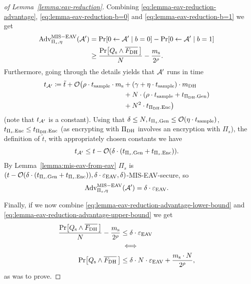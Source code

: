 \begin{proof}[of Lemma~\ref{lemma:eav-reduction}]
	Combining \eqref{eq:lemma-eav-reduction-advantage}, \eqref{eq:lemma-eav-reduction-b=0} and \eqref{eq:lemma-eav-reduction-b=1} we get
	\begin{align} \label{eq:lemma-eav-reduction-advantage-lower-bound}
		\begin{split}
			\advantage{\Pi_s}{\eta}{MIS-EAV}(\adv') & = \pr{0 \from \adv' \mid b = 0} - \pr{0 \from \adv' \mid b = 1}           \\
			& \ge \frac{\pr{\qs \land \overline{\fdh}\,}}{N} - \frac{\ms}{2^\rho}.
		\end{split}
	\end{align}
	Furthermore, going through the details yields that $\mathcal{A}'$ runs in time
	\begin{align*}
		\begin{split}
			t_{\mathcal{A}'} \coloneqq \tilde{t} + \mathcal{O}\big(\rho \cdot t_{\mathrm{sample}} \cdot m_\mathrm{s} & + (\gamma + \eta \cdot t_{\mathrm{sample}}) \cdot m_\mathrm{DH}  \\
			& + N \cdot (\rho \cdot t_{\mathrm{sample}} + t_{\Pi_{\mathrm{DH}}.\mathrm{Gen}})  \\
			& +  N^2 \cdot t_{\Pi_{\mathrm{DH}}.\mathrm{Enc}}\big)
		\end{split}
	\end{align*}
	(note that $t_{\mathcal{A}'}$ is a constant).
	Using that $\delta \le N, t_{\Pi_s.\mathrm{Gen}} \le \mathcal{O}(\eta \cdot t_{\mathrm{sample}})$, $t_{\Pi_s.\mathrm{Enc}} \le t_{\Pi_{\mathrm{DH}}.\mathrm{Enc}}$ (as encrypting with $\Pi_{\mathrm{DH}}$ involves an encryption with $\Pi_s$), the definition of $\tilde{t}$, with appropriately chosen constants we have
	\[
		t_{\mathcal{A}'} \le t - \mathcal{O}(\delta \cdot (t_{\Pi_s.\mathrm{Gen}} + t_{\Pi_s.\mathrm{Enc}})).
	\]
	By Lemma~\ref{lemma:mis-eav-from-eav} $\Pi_s$ is $(t - \mathcal{O}(\delta \cdot (t_{\Pi_s.\mathrm{Gen}} + t_{\Pi_s.\mathrm{Enc}})), \delta \cdot \varepsilon_\mathrm{EAV}, \delta)$-MIS-EAV-secure, so
	\begin{equation} \label{eq:lemma-eav-reduction-advantage-upper-bound}
		\mathrm{Adv}_{\Pi_s, \eta}^{\mathrm{MIS-EAV}}(\mathcal{A}') = \delta \cdot \varepsilon_\mathrm{EAV}.
	\end{equation}

	Finally, if we now combine \eqref{eq:lemma-eav-reduction-advantage-lower-bound} and \eqref{eq:lemma-eav-reduction-advantage-upper-bound} we get
	\begin{align*}
		\frac{\pr{\qs \land \overline{\fdh}\,}}{N} - \frac{\ms}{2^\rho} & \le \delta \cdot \eeav                                       \\
		                                                                & \iff                                                         \\
		\pr{\qs \land \overline{\fdh}\,}                                & \le \delta \cdot N \cdot \eeav + \frac{\ms \cdot N}{2^\rho},
	\end{align*}
	as was to prove.
\end{proof}

